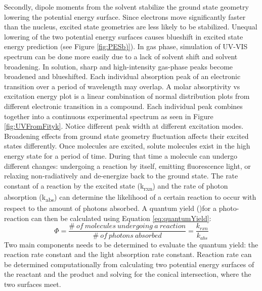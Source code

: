 \documentclass[
journal=jpcbfk, %
manuscript=article]{achemso}
\begin{document}
	Secondly, dipole moments from the solvent stabilize the ground state geometry lowering the potential energy surface. Since electrons move significantly faster than the nucleus, excited state geometries are less likely to be stabilized. Unequal lowering of the two potential energy surfaces causes blueshift in excited state energy prediction (see Figure \ref{fig:PESb)}). In gas phase, simulation of UV-VIS spectrum can be done more easily due to a lack of solvent shift and solvent broadening. In solution, sharp and high-intensity gas-phase peaks become broadened and blueshifted. 
	Each individual absorption peak of an electronic transition over a period of wavelength may overlap. A molar absorptivity vs excitation energy plot is a linear combination of normal distribution plots from different electronic transition in a compound. Each individual peak combines together into a continuous experimental spectrum as seen in Figure \ref{fig:UVFromFityk}. Notice different peak width at different excitation modes. Broadening effects from ground state geometry fluctuation affects their excited states differently. 
	Once molecules are excited, solute molecules exist in the high energy state for a period of time. During that time a molecule can undergo different changes: undergoing a reaction by itself, emitting fluorescence light, or relaxing non-radiatively and de-energize back to the ground state. The rate constant of a reaction by the excited state (k\textsubscript{rxn}) and the rate of photon absorption (k\textsubscript{abs}) can determine the likelihood of a certain reaction to occur with respect to the amount of photons absorbed. A quantum yield (\textPhi)for a photo-reaction can then be calculated using Equation \ref{eq:quantumYield}:
	\begin{equation}
	\label{eq:quantumYield}
	\Phi = \frac{\#\ of\ molecules\ undergoing\ a\ reaction}{\#\ of\ photons\ absorbed}=\frac{k_{rxn}}{k_{abs}}
	\end{equation}
	Two main components needs to be determined to evaluate the quantum yield: the reaction rate constant and the light absorption rate constant. Reaction rate can be determined computationally from calculating two potential energy surfaces of the reactant and the product and solving for the conical intersection, where the two surfaces meet.
	
\end{document}
